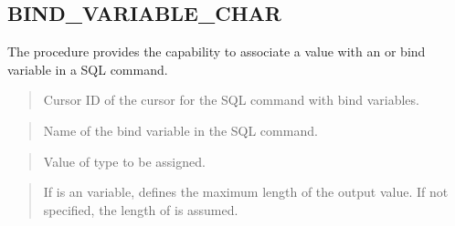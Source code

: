 \documentclass[letterpaper,10pt,english,openany,oneside]{sphinxmanual}
\begin{document}
\newpage


\subsection{BIND\_VARIABLE\_CHAR}
\label{\detokenize{bind_variable_char::doc}}\label{\detokenize{bind_variable_char:bind-variable-char}}
The  procedure provides the capability to associate
a  value with an  or  bind variable in a SQL command.
\begin{quote}

\begin{quote}

\end{quote}
\end{quote}


\begin{quote}

Cursor ID of the cursor for the SQL command with bind variables.
\end{quote}

\begin{quote}

Name of the bind variable in the SQL command.
\end{quote}

\begin{quote}

Value of type  to be assigned.
\end{quote}

\begin{quote}

If  is an  variable, defines the maximum length of the
output value. If not specified, the length of  is assumed.
\end{quote}

\newpage
\end{document}
